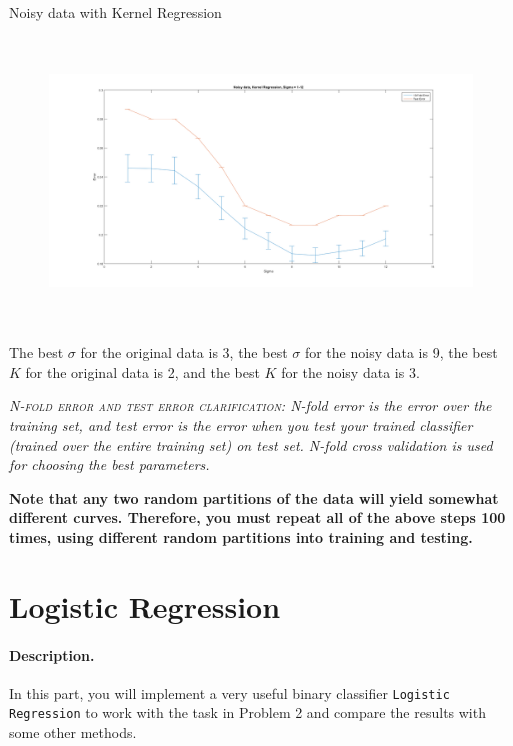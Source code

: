 \documentclass[english]{article}
\begin{document}
\begin{itemize}
Noisy data with Kernel Regression
\begin{figure}[H]
\centering
\includegraphics[width=7in, height=3in]{kern_noisy_varySIGMA.png}
\end{figure}
 
 The best $\sigma$ for the original data is 3, the best $\sigma$ for the noisy data is 9, the best $K$ for the original data is 2, and the best $K$ for the noisy data is 3.


\end{itemize}

\emph{\textsc{N-fold error and test error clarification:} N-fold error is the error over the training set, and test error is the error when you test your trained classifier (trained over the entire training set) on test set. N-fold cross validation is used for choosing the best parameters. }

 {\bf Note that any two random partitions of the data will yield somewhat different curves. Therefore, you must repeat all of the above steps 100 times, using different random partitions into training and testing.}

\section{Logistic Regression }

\paragraph{Description.} In this part, you will implement a very useful binary classifier {\tt Logistic Regression} to work with the task in Problem 2 and compare the results with some other methods. 
\end{document}

